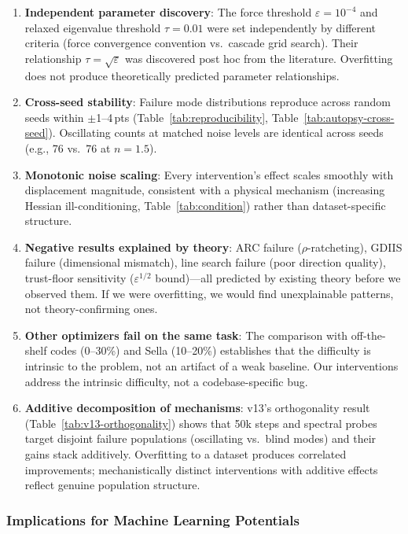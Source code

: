 \documentclass[11pt,a4paper]{article}
\theoremstyle{definition}
\begin{document}
\begin{enumerate}[nosep]
  \item \textbf{Independent parameter discovery}: The force threshold
    $\varepsilon = 10^{-4}$ and relaxed eigenvalue threshold
    $\tau = 0.01$ were set independently by different criteria (force
    convergence convention vs.\ cascade grid search).  Their
    relationship $\tau = \sqrt{\varepsilon}$ was discovered post hoc
    from the literature.  Overfitting does not produce theoretically
    predicted parameter relationships.
  \item \textbf{Cross-seed stability}: Failure mode distributions
    reproduce across random seeds within $\pm$1--4\,pts
    (Table~\ref{tab:reproducibility}, Table~\ref{tab:autopsy-cross-seed}).
    Oscillating counts at matched noise levels are identical across
    seeds (e.g., 76 vs.\ 76 at $n=1.5$).
  \item \textbf{Monotonic noise scaling}: Every intervention's effect
    scales smoothly with displacement magnitude, consistent with a
    physical mechanism (increasing Hessian ill-conditioning,
    Table~\ref{tab:condition}) rather than dataset-specific structure.
  \item \textbf{Negative results explained by theory}: ARC failure
    ($\rho$-ratcheting), GDIIS failure (dimensional mismatch), line
    search failure (poor direction quality), trust-floor sensitivity
    ($\varepsilon^{1/2}$ bound)---all predicted by existing theory
    before we observed them.  If we were overfitting, we would find
    unexplainable patterns, not theory-confirming ones.
  \item \textbf{Other optimizers fail on the same task}: The comparison
    with off-the-shelf codes (0--30\%) and Sella (10--20\%) establishes
    that the difficulty is intrinsic to the problem, not an artifact of
    a weak baseline.  Our interventions address the intrinsic difficulty,
    not a codebase-specific bug.
  \item \textbf{Additive decomposition of mechanisms}: v13's orthogonality
    result (Table~\ref{tab:v13-orthogonality}) shows that 50k steps and
    spectral probes target disjoint failure populations (oscillating vs.\
    blind modes) and their gains stack additively.  Overfitting to a
    dataset produces correlated improvements; mechanistically distinct
    interventions with additive effects reflect genuine population
    structure.
\end{enumerate}

\subsubsection{Implications for Machine Learning Potentials}
\end{document}
